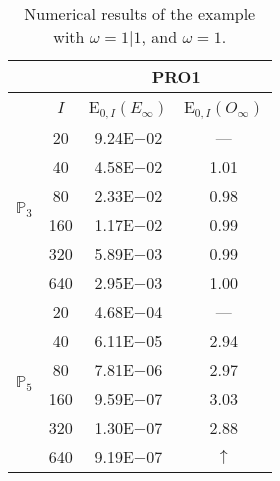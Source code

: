 \begin{table}[H]
\caption{Numerical results of the example with $\omega=1|1$, and $\omega=1$.}
\setlength{\tabcolsep}{5pt}
\centering
\begin{tabular}{@{}l c c c@{}}
\toprule
 &  & \multicolumn{2}{c}{PRO1}\\
\midrule
 & $I$ & E$_{0,I}(E_{\infty})$ & E$_{0,I}(O_{\infty})$\\
\midrule
\multirow{6}{*}{$\mathbb{P}_{3}$}
 & 20 & 9.24E$-$02 & ---\\
 & 40 & 4.58E$-$02 & 1.01\\
 & 80 & 2.33E$-$02 & 0.98\\
 & 160 & 1.17E$-$02 & 0.99\\
 & 320 & 5.89E$-$03 & 0.99\\
 & 640 & 2.95E$-$03 & 1.00\\
\midrule
\multirow{6}{*}{$\mathbb{P}_{5}$}
 & 20 & 4.68E$-$04 & ---\\
 & 40 & 6.11E$-$05 & 2.94\\
 & 80 & 7.81E$-$06 & 2.97\\
 & 160 & 9.59E$-$07 & 3.03\\
 & 320 & 1.30E$-$07 & 2.88\\
 & 640 & 9.19E$-$07 & $\uparrow$\\
\bottomrule
\end{tabular}
\label{Table:PRO:test_01_01_test45_pro1}
\end{table}
